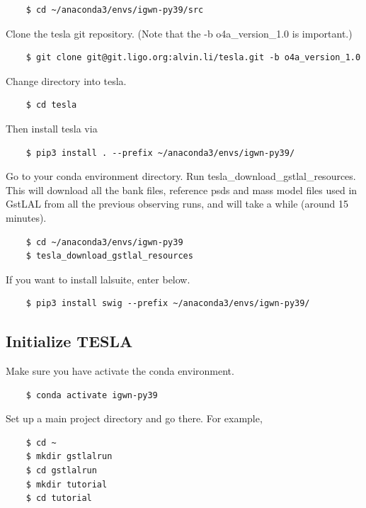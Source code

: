 \begin{verbatim}
    $ cd ~/anaconda3/envs/igwn-py39/src
\end{verbatim}

Clone the tesla git repository. (Note that the -b o4a\_version\_1.0 is important.)

\begin{verbatim}
    $ git clone git@git.ligo.org:alvin.li/tesla.git -b o4a_version_1.0
\end{verbatim}

Change directory into tesla.

\begin{verbatim}
    $ cd tesla
\end{verbatim}

Then install tesla via

\begin{verbatim}
    $ pip3 install . --prefix ~/anaconda3/envs/igwn-py39/
\end{verbatim}

Go to your conda environment directory. Run tesla\_download\_gstlal\_resources. This will download all the bank files, reference psds and mass model files used in GstLAL from all the previous observing runs, and will take a while (around 15 minutes).

\begin{verbatim}
    $ cd ~/anaconda3/envs/igwn-py39
    $ tesla_download_gstlal_resources
\end{verbatim}

If you want to install lalsuite, enter below.

\begin{verbatim}
    $ pip3 install swig --prefix ~/anaconda3/envs/igwn-py39/
\end{verbatim}

\subsection{Initialize TESLA}

Make sure you have activate the conda environment.

\begin{verbatim}
    $ conda activate igwn-py39
\end{verbatim}

Set up a main project directory and go there. For example,

\begin{verbatim}
    $ cd ~
    $ mkdir gstlalrun
    $ cd gstlalrun
    $ mkdir tutorial
    $ cd tutorial
\end{verbatim}


